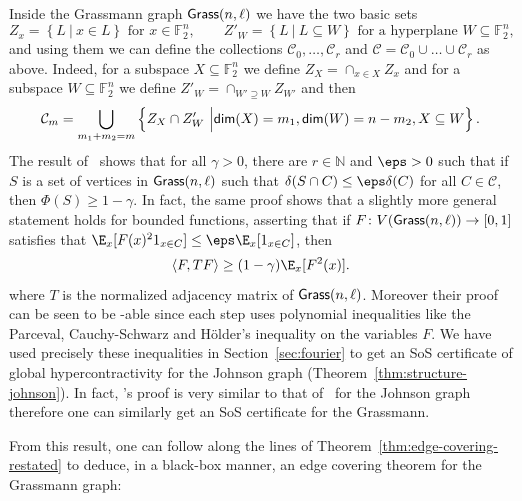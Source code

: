 Inside the Grassmann graph ${\sf Grass}(n,\ell)$ we have the two basic sets
\[
Z_x = \left\{L~|~x\in L\right\}\text{ for $x\in \mathbb{F}_2^n$},
\qquad
Z'_W = \left\{L~|~L\subseteq W\right\}\text{ for 
a hyperplane $W\subseteq \mathbb{F}_2^n$},
\]
and using them we can define the collections $\mathcal{C}_0,\ldots,\mathcal{C}_r$ and $\mathcal{C} = \mathcal{C}_0\cup\ldots\cup\mathcal{C}_r$ as above. Indeed, 
for a subspace $X\subseteq \mathbb{F}_2^n$ we define 
$Z_X = \cap_{x\in X}Z_x$ and for a subspace $W\subseteq \mathbb{F}_2^n$ we define $Z'_W=\cap_{W'\supseteq W} Z_{W'}$ 
and then
\[
\mathcal{C}_{m} = 
\bigcup_{m_1+m_2 = m}
\left\{Z_{X}\cap Z'_{W}~\Big|{\sf dim}(X) = m_1, {\sf dim}(W) = n-m_2, X\subseteq W\right\}.
\]
The result of~\cite{KhotMS18} shows that for all $\gamma>0$, 
there are $r\in\mathbb{N}$ and $\eps>0$ 
such that if $S$ is a set of 
vertices in ${\sf Grass}(n,\ell)$ such that $\delta(S\cap C)\leq \eps \delta(C)$ for all $C\in\mathcal{C}$, then $\Phi(S)\geq 1-\gamma$. In fact, the same proof shows that a slightly more general statement holds for bounded functions, 
asserting that if $F\colon V({\sf Grass}(n,\ell))\to [0,1]$ satisfies that 
$\E_{x}[F(x)^2 1_{x\in C}]\leq \eps \E_{x}[1_{x\in C}]$, then 
\[
\langle F, T F\rangle\geq (1-\gamma)\E_x[F^2(x)].
\]
where $T$ is the normalized adjacency matrix of ${\sf Grass}(n,\ell)$. Moreover their proof can be seen 
to be \sos-able since each step uses polynomial inequalities like the Parceval, Cauchy-Schwarz and H\"{o}lder's inequality on the variables $F$. We have used precisely these inequalities in Section~\ref{sec:fourier} to get an SoS certificate of global hypercontractivity for the Johnson graph (Theorem~\ref{thm:structure-johnson}). In fact, \cite{KhotMS18}'s proof is very similar to that of~\cite{KMMS} for the Johnson graph therefore one can similarly get an SoS certificate for the Grassmann.


From this result, one can follow along the lines of Theorem~\ref{thm:edge-covering-restated} to deduce, 
in a black-box manner, an edge covering theorem for 
the Grassmann graph: 

